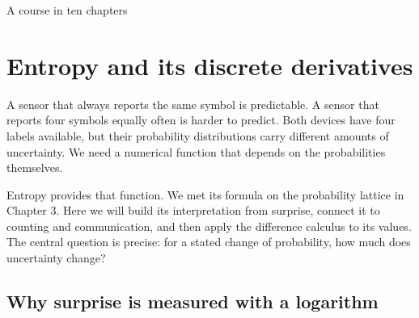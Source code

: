 \documentclass[11pt,oneside,openany]{book}
\theoremstyle{definition}
\theoremstyle{remark}
\numberwithin{equation}{chapter}
\begin{document}
\begin{titlepage}\color{ink}\centering\vspace*{1.0in}{\small\sffamily PROBABILITY AND MATHEMATICAL MODELLING\par}\vspace{.45in}{\Huge\bfseries Discrete Information\\[.12in]Geometry\par}\vspace{.35in}{\Large Finite Differences, Probability,\\and Information Flows\par}\vspace{1cm}{\Large Chapter 5\par}\vfill{}\vfill{\large A course in ten chapters\par}\end{titlepage}
\setcounter{chapter}{4}

\chapter{Entropy and its discrete derivatives}
A sensor that always reports the same symbol is predictable. A sensor that reports four symbols equally often is harder to predict. Both devices have four labels available, but their probability distributions carry different amounts of uncertainty. We need a numerical function that depends on the probabilities themselves.

Entropy provides that function. We met its formula on the probability lattice in Chapter 3. Here we will build its interpretation from surprise, connect it to counting and communication, and then apply the difference calculus to its values. The central question is precise: for a stated change of probability, how much does uncertainty change?

\section{Why surprise is measured with a logarithm}\label{ch05-why-surprise-is-measured-with-a-logarithm}
\end{document}
